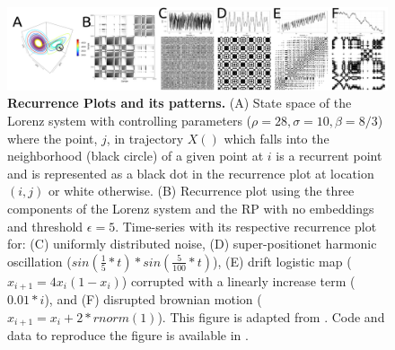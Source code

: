 \documentclass[fleqn,10pt]{wlscirep}
\begin{document}
\begin{figure}[ht]
\centering
\includegraphics[width=1.0\textwidth]{figures/methods/rps/versions/drawing-v00.pdf}
    \caption{
	{\bf Recurrence Plots and its patterns.} 
	(A) State space of the Lorenz system with controlling parameters 
	($\rho=28, \sigma=10, \beta=8/3$) where the point, $j$, in trajectory $X()$ which falls into the neighborhood 
	(black circle) of a given point at $i$ is a recurrent point and is 
	represented as a black dot in the recurrence plot at location 
	$(i, j)$ or white otherwise.
	(B) Recurrence plot using the 
	three components of the Lorenz system and the RP with no embeddings 
	and threshold $\epsilon=5$.
	Time-series with its respective recurrence plot for:
	(C) uniformly distributed noise,
	(D) super-positionet harmonic oscillation 
	($sin( \frac{1}{5}*t) * sin( \frac{5}{100}*t) $),
	(E) drift logistic map ($x_{i+1} = 4 x_i (1- x_i) $) corrupted 
	with a linearly increase term ($0.01*i$), and
	(F) disrupted brownian motion  ($x_{i+1} = x_i + 2*rnorm(1) $).
	This figure is adapted from \cite{marwan2015}.
	Code and data to reproduce the figure is available in \cite{srep2020}.
	}
    \label{fig:rps}
\end{figure}



\end{document}
